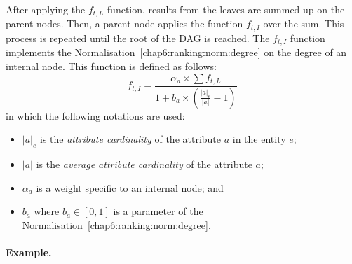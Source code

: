 After applying the $f_{t,L}$ function, results from the leaves are summed up on the parent nodes. Then, a parent node applies the function $f_{t,I}$ over the sum. This process is repeated until the root of the DAG is reached. The $f_{t,I}$ function implements the Normalisation~\ref{chap6:ranking:norm:degree} on the degree of an internal node. This function is defined as follows:
\begin{equation}
\label{chap6:ranking:bm25mf_a}
f_{t,I} = \frac{\alpha_a \times \sum{f_{t,L}} }{ 1 + b_a \times \left(\frac{ \left|{a}\right|_e }{ \left|{a}\right| } - 1\right) }
\end{equation}
in which the following notations are used:
\begin{itemize}
\item $\left|{a}\right|_e$ is the \emph{attribute cardinality} of the attribute $a$ in the entity $e$;
\item $\left|{a}\right|$ is the \emph{average attribute cardinality} of the attribute $a$;
\item $\alpha_a$ is a weight specific to an internal node; and
\item $b_a$ where $b_a \in \left[0,1\right]$ is a parameter of the Normalisation~\ref{chap6:ranking:norm:degree}.
\end{itemize}

\paragraph{Example.}

